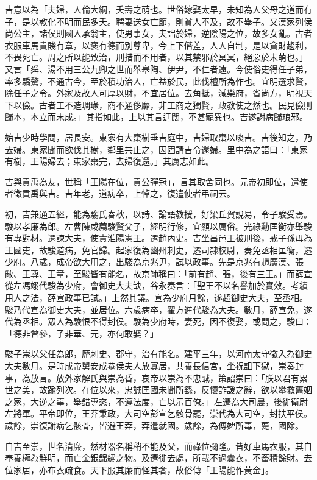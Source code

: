 \begin{pinyinscope}
吉意以為「夫婦，人倫大綱，夭壽之萌也。世俗嫁娶太早，未知為人父母之道而有子，是以教化不明而民多夭。聘妻送女亡節，則貧人不及，故不舉子。又漢家列侯尚公主，諸侯則國人承翁主，使男事女，夫詘於婦，逆陰陽之位，故多女亂。古者衣服車馬貴賤有章，以褒有德而別尊卑，今上下僭差，人人自制，是以貪財趨利，不畏死亡。周之所以能致治，刑措而不用者，以其禁邪於冥冥，絕惡於未萌也。」又言「舜、湯不用三公九卿之世而舉皋陶、伊尹，不仁者遠。今使俗吏得任子弟，率多驕驁，不通古今，至於積功治人，亡益於民，此伐檀所為作也。宜明選求賢，除任子之令。外家及故人可厚以財，不宜居位。去角抵，減樂府，省尚方，明視天下以儉。古者工不造琱瑑，商不通侈靡，非工商之獨賢，政教使之然也。民見儉則歸本，本立而末成。」其指如此，上以其言迂闊，不甚寵異也。吉遂謝病歸琅邪。

始吉少時學問，居長安。東家有大棗樹垂吉庭中，吉婦取棗以啖吉。吉後知之，乃去婦。東家聞而欲伐其樹，鄰里共止之，因固請吉令還婦。里中為之語曰：「東家有樹，王陽婦去；東家棗完，去婦復還。」其厲志如此。

吉與貢禹為友，世稱「王陽在位，貢公彈冠」，言其取舍同也。元帝初即位，遣使者徵貢禹與吉。吉年老，道病卒，上悼之，復遣使者弔祠云。

初，吉兼通五經，能為騶氏春秋，以詩、論語教授，好梁丘賀說易，令子駿受焉。駿以孝廉為郎。左曹陳咸薦駿賢父子，經明行修，宜顯以厲俗。光祿勳匡衡亦舉駿有專對材。遷諫大夫，使責淮陽憲王。遷趙內史。吉坐昌邑王被刑後，戒子孫毋為王國吏，故駿道病，免官歸。起家復為幽州刺史，遷司隸校尉，奏免丞相匡衡，遷少府。八歲，成帝欲大用之，出駿為京兆尹，試以政事。先是京兆有趙廣漢、張敞、王尊、王章，至駿皆有能名，故京師稱曰：「前有趙、張，後有三王。」而薛宣從左馮翊代駿為少府，會御史大夫缺，谷永奏言：「聖王不以名譽加於實效。考績用人之法，薛宣政事已試。」上然其議。宣為少府月餘，遂超御史大夫，至丞相。駿乃代宣為御史大夫，並居位。六歲病卒，翟方進代駿為大夫。數月，薛宣免，遂代為丞相。眾人為駿恨不得封侯。駿為少府時，妻死，因不復娶，或問之，駿曰：「德非曾參，子非華、元，亦何敢娶？」

駿子崇以父任為郎，歷刺史、郡守，治有能名。建平三年，以河南太守徵入為御史大夫數月。是時成帝舅安成恭侯夫人放寡居，共養長信宮，坐祝詛下獄，崇奏封事，為放言。放外家解氏與崇為昏，哀帝以崇為不忠誠，策詔崇曰：「朕以君有累世之美，故踰列次。在位以來，忠誠匡國未聞所繇，反懷詐諼之辭，欲以攀救舊姻之家，大逆之辜，舉錯專恣，不遵法度，亡以示百僚。」左遷為大司農，後徙衛尉左將軍。平帝即位，王莽秉政，大司空彭宣乞骸骨罷，崇代為大司空，封扶平侯。歲餘，崇復謝病乞骸骨，皆避王莽，莽遣就國。歲餘，為傅婢所毒，薨，國除。

自吉至崇，世名清廉，然材器名稱稍不能及父，而祿位彌隆。皆好車馬衣服，其自奉養極為鮮明，而亡金銀錦繡之物。及遷徙去處，所載不過囊衣，不畜積餘財。去位家居，亦布衣疏食。天下服其廉而怪其奢，故俗傳「王陽能作黃金」。


\end{pinyinscope}
